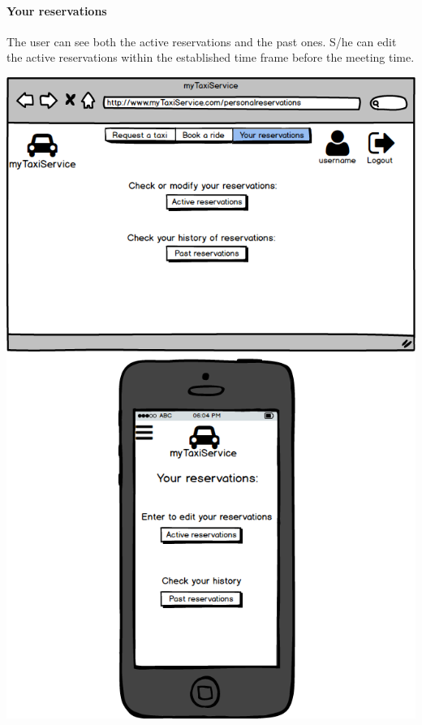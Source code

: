 \documentclass[a4paper,11pt]{report} %
\begin{document}
	\paragraph{Your reservations} The user can see both the active reservations and the past ones. S/he can edit the active reservations within the established time frame before the meeting time.
	\begin{center}
		\includegraphics[width=0.9\linewidth]{Pictures/YourReservations}
	\end{center}
	\pagebreak
	
\end{document}
